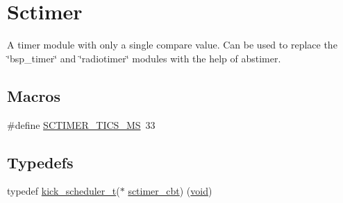 \hypertarget{group__sctimer}{}\section{Sctimer}
\label{group__sctimer}


A timer module with only a single compare value. Can be used to replace the \char`\"{}bsp\+\_\+timer\char`\"{} and \char`\"{}radiotimer\char`\"{} modules with the help of abstimer.  


\subsection*{Macros}
\begin{DoxyCompactItemize}
\item 
\#define \hyperlink{group__sctimer_ga08e4c399d2058414497e57a37033eaf0}{S\+C\+T\+I\+M\+E\+R\+\_\+\+T\+I\+C\+S\+\_\+\+MS}~33
\end{DoxyCompactItemize}
\subsection*{Typedefs}
\begin{DoxyCompactItemize}
\item 
typedef \hyperlink{group__board_gac9ebdcc0a4f3c8422f5f4f0fbbe0ded0}{kick\+\_\+scheduler\+\_\+t}($\ast$ \hyperlink{group__sctimer_ga0a0d5fd87809e69b643e507977c2f8e4}{sctimer\+\_\+cbt}) (\hyperlink{usb__devapi_8h_afabf60e7f57651d6d595a02c75f07cd0}{void})
\end{DoxyCompactItemize}
